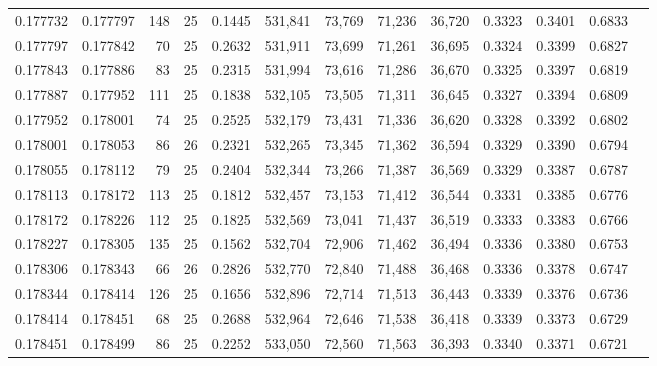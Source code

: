 \begin{tabular}{rrrrrrrrrrrrr}
0.177732 & 0.177797 &   148 &  25 &                                     0.1445 & 531,841 &  73,769 &  71,236 &  36,720 & 0.3323 & 0.3401 & 0.6833 \\
0.177797 & 0.177842 &    70 &  25 &                                     0.2632 & 531,911 &  73,699 &  71,261 &  36,695 & 0.3324 & 0.3399 & 0.6827 \\
0.177843 & 0.177886 &    83 &  25 &                                     0.2315 & 531,994 &  73,616 &  71,286 &  36,670 & 0.3325 & 0.3397 & 0.6819 \\
0.177887 & 0.177952 &   111 &  25 &                                     0.1838 & 532,105 &  73,505 &  71,311 &  36,645 & 0.3327 & 0.3394 & 0.6809 \\
0.177952 & 0.178001 &    74 &  25 &                                     0.2525 & 532,179 &  73,431 &  71,336 &  36,620 & 0.3328 & 0.3392 & 0.6802 \\
0.178001 & 0.178053 &    86 &  26 &                                     0.2321 & 532,265 &  73,345 &  71,362 &  36,594 & 0.3329 & 0.3390 & 0.6794 \\
0.178055 & 0.178112 &    79 &  25 &                                     0.2404 & 532,344 &  73,266 &  71,387 &  36,569 & 0.3329 & 0.3387 & 0.6787 \\
0.178113 & 0.178172 &   113 &  25 &                                     0.1812 & 532,457 &  73,153 &  71,412 &  36,544 & 0.3331 & 0.3385 & 0.6776 \\
0.178172 & 0.178226 &   112 &  25 &                                     0.1825 & 532,569 &  73,041 &  71,437 &  36,519 & 0.3333 & 0.3383 & 0.6766 \\
0.178227 & 0.178305 &   135 &  25 &                                     0.1562 & 532,704 &  72,906 &  71,462 &  36,494 & 0.3336 & 0.3380 & 0.6753 \\
0.178306 & 0.178343 &    66 &  26 &                                     0.2826 & 532,770 &  72,840 &  71,488 &  36,468 & 0.3336 & 0.3378 & 0.6747 \\
0.178344 & 0.178414 &   126 &  25 &                                     0.1656 & 532,896 &  72,714 &  71,513 &  36,443 & 0.3339 & 0.3376 & 0.6736 \\
0.178414 & 0.178451 &    68 &  25 &                                     0.2688 & 532,964 &  72,646 &  71,538 &  36,418 & 0.3339 & 0.3373 & 0.6729 \\
0.178451 & 0.178499 &    86 &  25 &                                     0.2252 & 533,050 &  72,560 &  71,563 &  36,393 & 0.3340 & 0.3371 & 0.6721 \\

\end{tabular}
